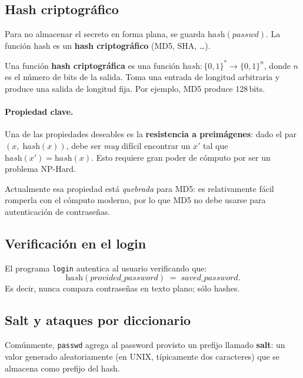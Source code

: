 \documentclass[11pt,a4paper]{article}
\begin{document}
\subsection{Hash criptográfico}

Para no almacenar el secreto en forma plana, se guarda
$\textit{hash}(\textit{passwd})$. La función hash es un \textbf{hash
criptográfico} (MD5, SHA, \ldots).

\begin{definicion}
Una función \textbf{hash criptográfica} es una función
$\textit{hash} : \{0,1\}^* \to \{0,1\}^n$, donde $n$ es el número de
bits de la salida. Toma una entrada de longitud arbitraria y produce
una salida de longitud fija. Por ejemplo, MD5 produce 128\,bits.
\end{definicion}

\paragraph{Propiedad clave.}
Una de las propiedades deseables es la \textbf{resistencia a
preimágenes}: dado el par $(x,\;\textit{hash}(x))$, debe ser
\emph{muy} difícil encontrar un $x'$ tal que
$\textit{hash}(x') = \textit{hash}(x)$. Esto requiere gran poder de
cómputo por ser un problema NP-Hard.

\begin{importante}
Actualmente esa propiedad está \emph{quebrada} para MD5: es
relativamente fácil romperla con el cómputo moderno, por lo que MD5 no
debe usarse para autenticación de contraseñas.
\end{importante}

\subsection{Verificación en el login}

El programa \texttt{login} autentica al usuario verificando que:
\[
\textit{hash}(\textit{provided\_password}) \;=\; \textit{saved\_password}.
\]
Es decir, nunca compara contraseñas en texto plano; sólo hashes.

\subsection{Salt y ataques por diccionario}

Comúnmente, \texttt{passwd} agrega al password provisto un prefijo
llamado \textbf{salt}: un valor generado aleatoriamente (en UNIX,
típicamente dos caracteres) que se almacena como prefijo del hash.
\end{document}
